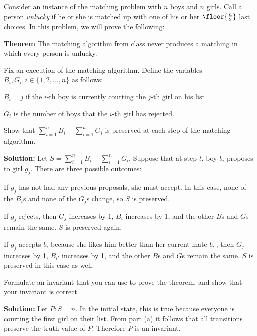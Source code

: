                  
\problem
Consider an instance of the matching problem with $n$ boys and $n$
girls.  Call a person {\em unlucky} if he or she is matched up with
one of his or her $\floor{\frac{n}{2}}$ last choices.  In this
problem, we will prove the following: 
 
{\bf Theorem}  The matching algorithm from class never produces a
matching in which every person is unlucky.

Fix an execution of the matching algorithm.  Define the variables 
$B_i, G_i, i \in \{ 1, 2, \ldots, n \}$ as follows:
\begin{description}
\item $B_i = j$ if the $i$-th boy is currently courting the $j$-th girl
on his list
\item $G_i$ is the number of boys that the $i$-th girl has rejected.
\end{description}

\ppart
Show that $\sum_{i=1} ^n B_i - \sum_{i=1} ^n G_i$ is preserved at each
step of the matching algorithm.

\begin{solution}
\medskip
\textbf{Solution:}
Let $S = \sum_{i=1} ^n B_i - \sum_{i=1} ^n G_i$.  Suppose that at step
$t$, boy $b_i$ proposes to girl $g_j$.  There are three possible outcomes:

If $g_j$ has not had any previous proposals, she must accept.  In this
case, none of the $B_i$s and none of the $G_j$s change, so $S$ is preserved.

If $g_j$ rejects, then $G_j$ increases by 1, $B_i$ increases by 1, and
the other $B$s and $G$s remain the same.  $S$ is preserved again.

If $g_j$ accepts $b_i$ because she likes him better than her current
mate $b_{i'}$, then $G_j$ increases by 1, $B_{i'}$ increases by 1, and
the other $B$s and $G$s remain the same.  $S$ is preserved in this case
as well.

\end{solution}

\ppart
Formulate an invariant that you can use to prove the theorem, and 
show that your invariant is correct.

\begin{solution}
\medskip
\textbf{Solution:}
Let $P : S = n$.  In the initial state, this is true because everyone is
courting the first girl on their list.  From part (a) it follows that
all transitions preserve the truth value of $P$.  Therefore $P$ is an
invariant.

\end{solution}

